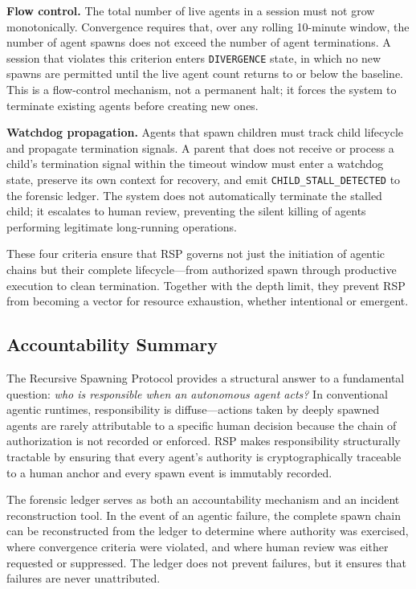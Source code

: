 \textbf{Flow control.} The total number of live agents in a session must not grow monotonically. Convergence requires that, over any rolling 10-minute window, the number of agent spawns does not exceed the number of agent terminations. A session that violates this criterion enters \texttt{DIVERGENCE} state, in which no new spawns are permitted until the live agent count returns to or below the baseline. This is a flow-control mechanism, not a permanent halt; it forces the system to terminate existing agents before creating new ones.

\textbf{Watchdog propagation.} Agents that spawn children must track child lifecycle and propagate termination signals. A parent that does not receive or process a child's termination signal within the timeout window must enter a watchdog state, preserve its own context for recovery, and emit \texttt{CHILD\_STALL\_DETECTED} to the forensic ledger. The system does not automatically terminate the stalled child; it escalates to human review, preventing the silent killing of agents performing legitimate long-running operations.

These four criteria ensure that RSP governs not just the initiation of agentic chains but their complete lifecycle---from authorized spawn through productive execution to clean termination. Together with the depth limit, they prevent RSP from becoming a vector for resource exhaustion, whether intentional or emergent.

\subsection{Accountability Summary}
\label{sec:rsp-accountability-summary}

The Recursive Spawning Protocol provides a structural answer to a fundamental question: \textit{who is responsible when an autonomous agent acts?} In conventional agentic runtimes, responsibility is diffuse---actions taken by deeply spawned agents are rarely attributable to a specific human decision because the chain of authorization is not recorded or enforced. RSP makes responsibility structurally tractable by ensuring that every agent's authority is cryptographically traceable to a human anchor and every spawn event is immutably recorded.

The forensic ledger serves as both an accountability mechanism and an incident reconstruction tool. In the event of an agentic failure, the complete spawn chain can be reconstructed from the ledger to determine where authority was exercised, where convergence criteria were violated, and where human review was either requested or suppressed. The ledger does not prevent failures, but it ensures that failures are never unattributed.

